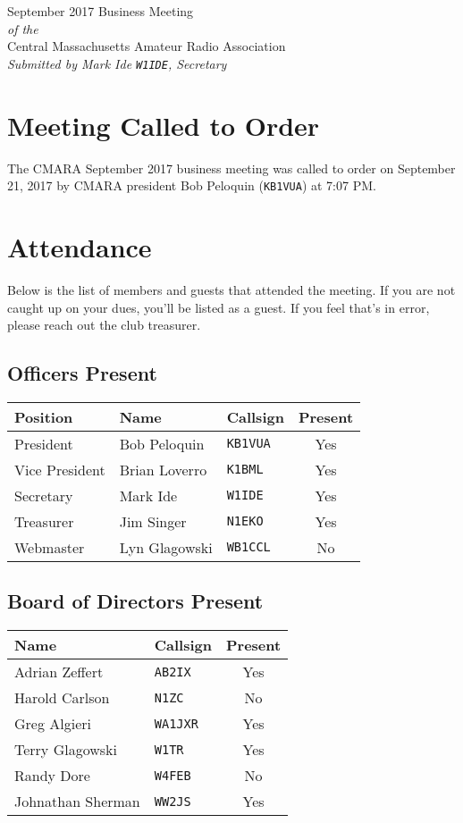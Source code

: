 \documentclass[10pt,letterpaper]{article}
\begin{document}
\begin{center}
{\huge September 2017 Business Meeting}\\
\emph{of the}\\
{\Large Central Massachusetts Amateur Radio Association}\\
\emph{Submitted by Mark Ide \texttt{W1IDE}, Secretary}
\end{center}

\section{Meeting Called to Order}
The CMARA September 2017 business meeting was called to order on September 21, 2017 by CMARA president Bob Peloquin (\texttt{KB1VUA}) at 7:07 PM.

\section{Attendance}
\noindent
Below is the list of members and guests that attended the meeting. If you are not caught up on your dues, you'll be listed as a guest. If you feel that's in error, please reach out the club treasurer.

\subsection{Officers Present}
\begin{tabular}{|l|l|l|c|}
  \hline
  \textbf{Position} & \textbf{Name}  & \textbf{Callsign} & \textbf{Present} \\ \hline
  President         & Bob Peloquin   & \texttt{KB1VUA}   & Yes \\
  Vice President    & Brian Loverro  & \texttt{K1BML}    & Yes \\
  Secretary         & Mark Ide       & \texttt{W1IDE}    & Yes \\
  Treasurer         & Jim Singer     & \texttt{N1EKO}    & Yes \\
  Webmaster         & Lyn Glagowski  & \texttt{WB1CCL}   & No  \\
  \hline
\end{tabular}

\subsection{Board of Directors Present}
\begin{tabular}{|l|l|c|}
  \hline
  \textbf{Name}     & \textbf{Callsign} & \textbf{Present} \\ \hline
  Adrian Zeffert    & \texttt{AB2IX}    & Yes \\
  Harold Carlson    & \texttt{N1ZC}     & No  \\
  Greg Algieri      & \texttt{WA1JXR}   & Yes \\
  Terry Glagowski   & \texttt{W1TR}     & Yes \\
  Randy Dore        & \texttt{W4FEB}    & No  \\
  Johnathan Sherman & \texttt{WW2JS}    & Yes \\
  \hline
\end{tabular}
\end{document}
